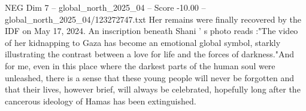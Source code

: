 \begin{textsample}{NEG Dim 7 – global\_north\_2025\_04 – Score -10.00 – global\_north\_2025\_04/123272747.txt}
Her remains were finally recovered by the IDF on May 17, 2024.
An inscription beneath Shani ' s photo reads :"The video of her kidnapping to Gaza has become an emotional global symbol, starkly illustrating the contrast between a love for life and the forces of darkness."And for me, even in this place where the darkest parts of the human soul were unleashed, there is a sense that these young people will never be forgotten and that their lives, however brief, will always be celebrated, hopefully long after the cancerous ideology of Hamas has been extinguished.

\end{textsample}
